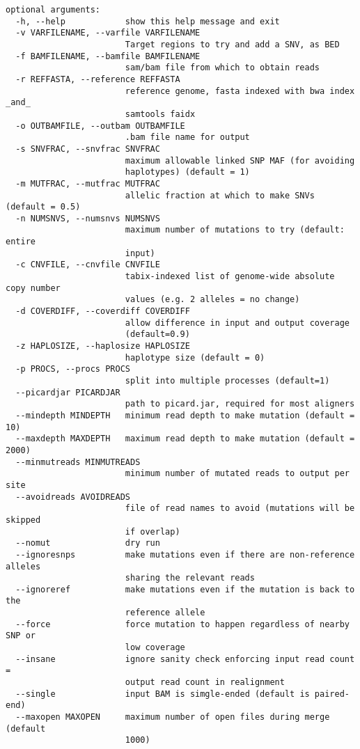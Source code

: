 \documentclass[letterpaper,11pt]{article}
\begin{document}
\begin{verbatim}
optional arguments:
  -h, --help            show this help message and exit
  -v VARFILENAME, --varfile VARFILENAME
                        Target regions to try and add a SNV, as BED
  -f BAMFILENAME, --bamfile BAMFILENAME
                        sam/bam file from which to obtain reads
  -r REFFASTA, --reference REFFASTA
                        reference genome, fasta indexed with bwa index _and_
                        samtools faidx
  -o OUTBAMFILE, --outbam OUTBAMFILE
                        .bam file name for output
  -s SNVFRAC, --snvfrac SNVFRAC
                        maximum allowable linked SNP MAF (for avoiding
                        haplotypes) (default = 1)
  -m MUTFRAC, --mutfrac MUTFRAC
                        allelic fraction at which to make SNVs (default = 0.5)
  -n NUMSNVS, --numsnvs NUMSNVS
                        maximum number of mutations to try (default: entire
                        input)
  -c CNVFILE, --cnvfile CNVFILE
                        tabix-indexed list of genome-wide absolute copy number
                        values (e.g. 2 alleles = no change)
  -d COVERDIFF, --coverdiff COVERDIFF
                        allow difference in input and output coverage
                        (default=0.9)
  -z HAPLOSIZE, --haplosize HAPLOSIZE
                        haplotype size (default = 0)
  -p PROCS, --procs PROCS
                        split into multiple processes (default=1)
  --picardjar PICARDJAR
                        path to picard.jar, required for most aligners
  --mindepth MINDEPTH   minimum read depth to make mutation (default = 10)
  --maxdepth MAXDEPTH   maximum read depth to make mutation (default = 2000)
  --minmutreads MINMUTREADS
                        minimum number of mutated reads to output per site
  --avoidreads AVOIDREADS
                        file of read names to avoid (mutations will be skipped
                        if overlap)
  --nomut               dry run
  --ignoresnps          make mutations even if there are non-reference alleles
                        sharing the relevant reads
  --ignoreref           make mutations even if the mutation is back to the
                        reference allele
  --force               force mutation to happen regardless of nearby SNP or
                        low coverage
  --insane              ignore sanity check enforcing input read count =
                        output read count in realignment
  --single              input BAM is simgle-ended (default is paired-end)
  --maxopen MAXOPEN     maximum number of open files during merge (default
                        1000)

\end{verbatim}
\end{document}
